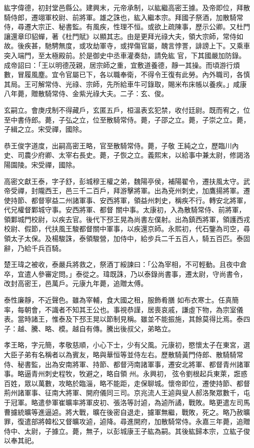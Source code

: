 \begin{pinyinscope}
 紘字偉德，初封堂邑縣公。建興末，元帝承制，以紘繼高密王據。及帝即位，拜散騎侍郎，遷翊軍校尉、前將軍。雄之誅也，紘入繼本宗。拜國子祭酒，加散騎常侍，尋遷大宗正、秘書監。有風疾，性理不恒。或欲上疏陳事，歷示公卿。又杜門讓還章印貂蟬，著《杜門賦》以顯其志。由是更拜光祿大夫，領大宗師，常侍如故。後疾甚，馳騁無度，或攻劫軍寺，或捍傷官屬，醜言悖詈，誹謗上下。又乘車突入端門，至太極殿前。於是御史中丞車灌奏劾，請免紘
 官，下其國嚴加防錄。成帝詔曰：「王以明德茂親，居宗師之重，宜敷道養德，靜一其操。而頃游行煩數，冒履風塵。宜令官屬已下，各以職奉衛，不得令王復有此勞。內外職司，各慎其局。王可解常侍、光祿、宗師，先所給車牛可錄取，賜米布床帳以養疾。」咸康八年薨，贈散騎常侍、金紫光祿大夫。二子：玄、俊。



 玄嗣立。會庚戌制不得藏戶，玄匿五戶，桓溫表玄犯禁，收付廷尉。既而宥之，位至中書侍郎。薨，子弘之立，位至散騎常侍。薨，子邵之立。薨，子崇之立。薨，子緝之立。宋受禪，國除。



 恭王俊字道度，出嗣高密王略，官至散騎常侍。薨，子敬
 王純之立，歷臨川內史、司農少府卿、太宰右長史。薨，子恢之立。義熙末，以給事中兼太尉，修謁洛陽園陵。宋受禪，國除。



 高密文獻王泰，字子舒，彭城穆王權之弟，魏陽亭侯，補陽翟令，遷扶風太守。武帝受禪，封隴西王，邑三千二百戶，拜游擊將軍。出為兗州刺史，加鷹揚將軍。遷使持節、都督寧益二州諸軍事、安西將軍，領益州刺史，稱疾不行。轉安北將軍，代兄權督鄴城守事。安西將軍、都督
 關中事。太康初，入為散騎常侍、前將軍，領鄴城門校尉，以疾去官。後代下邳王晃為尚書左僕射。出為鎮西將軍，領護西戎校尉、假節，代扶風王駿都督關中軍事，以疾還京師。永熙初，代石鑒為司空，尋領太子太保。及楊駿誅，泰領駿營，加侍中，給步兵二千五百人，騎五百匹。泰固辭，乃給千兵百騎。



 楚王瑋之被收，泰嚴兵將救之，祭酒丁綏諫曰：「公為宰相，不可輕動。且夜中倉卒，宜遣人參審定問。」泰從之。瑋既誅，乃以泰錄尚書事，遷太尉，守尚書令，改封高密王，邑萬戶。元康九年薨，追贈太傅。



 泰性廉靜，不近聲色。雖為宰輔，食大國之租，服飾肴膳
 如布衣寒士。任真簡率，每朝會，不識者不知其王公也。事視恭謹，居喪哀戚，謙虛下物，為宗室儀表。當時諸王，惟泰及下邳王晃以節制見稱。雖並不能振施，其餘莫得比焉。泰四子：越、騰、略、模。越自有傳。騰出後叔父，弟略立。



 孝王略，字元簡，孝敬慈順，小心下士，少有父風。元康初，愍懷太子在東宮，選大臣子弟有名稱者以為賓友，略與華恒等並侍左右。歷散騎黃門侍郎、散騎騎常侍、秘書監，出為安南將軍、持節、都督沔南諸軍事，遷安北將軍、都督青州諸軍事。略逼青州刺史程牧，牧避之，略自領
 州。永興初，弦令劉根起兵東萊，誑惑百姓，眾以萬數，攻略於臨淄，略不能距，走保聊城。懷帝即位，遷使持節、都督荊州諸軍事、征南大將軍、開府儀同三司。京兆流人王逌與叟人郝洛聚眾數千，屯于冠軍。略遣參軍崔曠率將軍皮初、張洛等討逌，為逌所譎，戰敗。略更遣左司馬曹攄統曠等進逼逌。將大戰，曠在後密自退走，攄軍無繼，戰敗，死之。略乃赦曠罪，復遣部將韓松又督曠攻逌，逌降。尋進開府，加散騎常侍。永嘉三年薨，追贈侍中、太尉，子據立。薨，無子，以彭城康王子紘為嗣。其後紘歸本宗，立紘子俊以奉其祀。




\end{pinyinscope}
